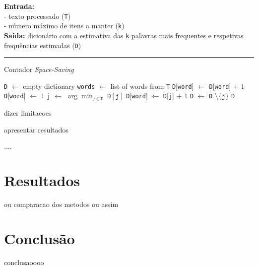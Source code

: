 \documentclass[mirror, portugues]{revdetua}
\begin{document}
\begin{algorithm}[H]
\raggedright
\textbf{Entrada:} \\
- texto processado (\texttt{T}) \\
- número máximo de itens a manter (\texttt{k}) \\
\textbf{Saída:} dicionário com a estimativa das \texttt{k} palavras mais frequentes e respetivas frequências estimadas (\texttt{D}) \\
\hrule 
\caption{Contador \textit{Space-Saving} \cite{CG09}}
\begin{algorithmic}[1]
    \State \texttt{D} $\gets$ empty dictionary
    \State \texttt{words} $\gets$ list of words from \texttt{T}
            \State \texttt{D}[\texttt{word}] $\gets$ \texttt{D}[\texttt{word}] + $1$
            \State \texttt{D}[\texttt{word}] $\gets$ $1$
        \Else
            \State \texttt{j} $\gets$ $\arg \min_{j \in \texttt{D}}\ \texttt{D}[\texttt{j}]$
            \State \texttt{D}[\texttt{word}] $\gets$ \texttt{D}[\texttt{j}] + $1$
            \State \texttt{D} $\gets$ \texttt{D} $\setminus \{\texttt{j}\}$
        \EndIf
    \EndFor
    \State \Return \texttt{D}
\end{algorithmic}
\end{algorithm}

dizer limitacoes

apresentar resultados

....


\section{Resultados}

ou comparacao dos metodos ou assim




\section{Conclusão}

conclusaoooo


\end{document}
